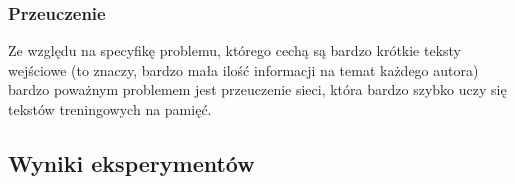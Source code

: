 \subsubsection{Przeuczenie}
Ze względu na specyfikę problemu, którego cechą są bardzo krótkie teksty wejściowe (to znaczy, bardzo 
mała ilość informacji na temat każdego autora) bardzo poważnym problemem jest przeuczenie sieci, która
bardzo szybko uczy się tekstów treningowych na pamięć. 

\subsection{Wyniki eksperymentów}
